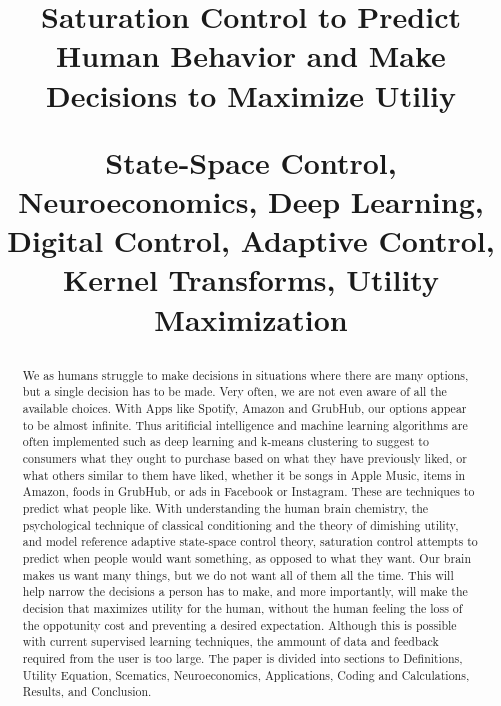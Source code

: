 \documentclass[conference]{IEEEtran}
\begin{document}
\title{Saturation Control to Predict Human Behavior and Make Decisions to Maximize Utiliy\\

\author{
}

\maketitle

\begin{abstract}
We as humans struggle to make decisions in situations where there are many options, but a single decision has to be made. Very often, we are not even aware of all the available choices. With Apps like Spotify, Amazon and GrubHub, our options appear to be almost infinite. Thus aritificial intelligence and machine learning algorithms are often implemented such as deep learning and k-means clustering to suggest to consumers what they ought to purchase based on what they have previously liked, or what others similar to them have liked, whether it be songs in Apple Music, items in Amazon, foods in GrubHub, or ads in Facebook or Instagram. These are techniques to predict what people like. With understanding the human brain chemistry, the psychological technique of classical conditioning and the theory of dimishing utility, and model reference adaptive state-space control theory, saturation control attempts to predict when people would want something, as opposed to what they want. Our brain makes us want many things, but we do not want all of them all the time. This will help narrow the decisions a person has to make, and more importantly, will make the decision that maximizes utility for the human, without the human feeling the loss of the oppotunity cost and preventing a desired expectation. Although this is possible with current supervised learning techniques, the ammount of data and feedback required from the user is too large. The paper is divided into sections to Definitions, Utility Equation, Scematics, Neuroeconomics, Applications, Coding and Calculations, Results, and Conclusion.
\end{abstract}

\begin{IEEEkeywords}
State-Space Control, Neuroeconomics, Deep Learning, Digital Control, Adaptive Control, Kernel Transforms, Utility Maximization
\end{IEEEkeywords}

}
\end{document}
